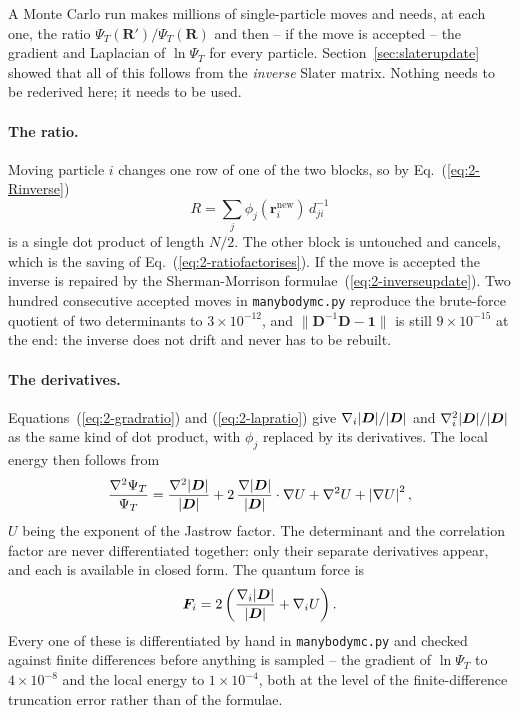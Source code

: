 A Monte Carlo run makes millions of single-particle moves and needs, at each
one, the ratio $\Psi_T(\bm{R}')/\Psi_T(\bm{R})$ and then -- if the move is
accepted -- the gradient and Laplacian of $\ln\Psi_T$ for every particle.
Section~\ref{sec:slaterupdate} showed that all of this follows from the
\emph{inverse} Slater matrix.  Nothing needs to be rederived here; it needs to
be used.

\paragraph{The ratio.}
Moving particle $i$ changes one row of one of the two blocks, so by
Eq.~(\ref{eq:2-Rinverse})
\begin{equation}
  R = \sum_{j}\phi_j(\bm{r}_i^{\mathrm{new}})\,d^{-1}_{ji}
  \label{eq:16-ratio}
\end{equation}
is a single dot product of length $N/2$.  The other block is untouched and
cancels, which is the saving of Eq.~(\ref{eq:2-ratiofactorises}).  If the move
is accepted the inverse is repaired by the Sherman-Morrison
formulae~(\ref{eq:2-inverseupdate}).  Two hundred consecutive accepted moves in
\texttt{manybodymc.py} reproduce the brute-force quotient of two determinants
to $3\times10^{-12}$, and $\|\bm{D}^{-1}\bm{D}-\bm{1}\|$ is still
$9\times10^{-15}$ at the end: the inverse does not drift and never has to be
rebuilt.

\paragraph{The derivatives.}
Equations~(\ref{eq:2-gradratio}) and (\ref{eq:2-lapratio}) give
$\nabla_i{|\boldsymbol{D}|}/{|\boldsymbol{D}|}$ and $\nabla_i^2{|\boldsymbol{D}|}/{|\boldsymbol{D}|}$ as the same kind of
dot product, with $\phi_j$ replaced by its derivatives.  The local energy then
follows from
\begin{equation}
  \frac{\nabla^2\Psi_T}{\Psi_T}
   = \frac{\nabla^2{|\boldsymbol{D}|}}{{|\boldsymbol{D}|}}
   + 2\,\frac{\nabla{|\boldsymbol{D}|}}{{|\boldsymbol{D}|}}\cdot\nabla U
   + \nabla^2 U + \left|\nabla U\right|^2 ,
  \label{eq:16-laplacian}
\end{equation}
$U$ being the exponent of the Jastrow factor.  The determinant and the
correlation factor are never differentiated together: only their separate
derivatives appear, and each is available in closed form.  The quantum force is
\begin{equation}
  \bm{F}_i = 2\left(\frac{\nabla_i{|\boldsymbol{D}|}}{{|\boldsymbol{D}|}} + \nabla_i U\right).
  \label{eq:16-quantumforce}
\end{equation}
Every one of these is differentiated by hand in \texttt{manybodymc.py} and
checked against finite differences before anything is sampled -- the gradient
of $\ln\Psi_T$ to $4\times10^{-8}$ and the local energy to $1\times10^{-4}$,
both at the level of the finite-difference truncation error rather than of the
formulae.

